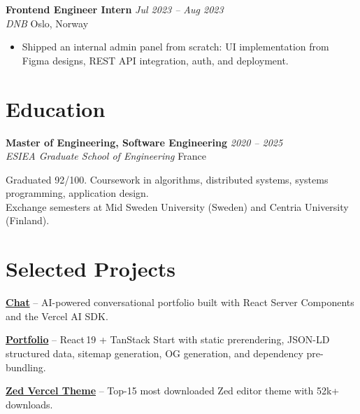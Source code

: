 \documentclass[a4paper,10pt]{article}
\newcommand{\entry}[4]{%
    \noindent\textbf{#1} \hfill \textit{#2} \\
    \textit{#3} \hfill #4
    \vspace{1pt}
}
\newcommand{\projectline}[3]{%
    \noindent\href{#2}{\textbf{#1}} -- #3
}
\begin{document}
\vspace{2pt}

\entry{Frontend Engineer Intern}{Jul 2023 -- Aug 2023}{DNB}{Oslo, Norway}
\begin{itemize}
    \item Shipped an internal admin panel from scratch: UI implementation from Figma designs, REST API integration, auth, and deployment.
\end{itemize}

\section{Education}

\entry{Master of Engineering, Software Engineering}{2020 -- 2025}{ESIEA Graduate School of Engineering}{France}

\vspace{-2pt}
\noindent Graduated 92/100. Coursework in algorithms, distributed systems, systems programming, application design. \\
Exchange semesters at Mid Sweden University (Sweden) and Centria University (Finland).

\section{Selected Projects}

\projectline{Chat}{https://chat.brodin.dev}{AI-powered conversational portfolio built with React Server Components and the Vercel AI SDK.}

\vspace{0pt}

\projectline{Portfolio}{https://brodin.dev}{React\,19 + TanStack Start with static prerendering, JSON-LD structured data, sitemap generation, OG generation, and dependency pre-bundling.}

\vspace{0pt}

\projectline{Zed Vercel Theme}{https://zed.dev/extensions?query=vercel}{Top-15 most downloaded Zed editor theme with 52k+ downloads.}
\end{document}

